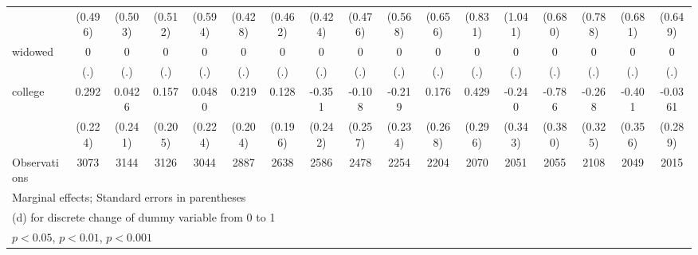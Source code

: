{\begin{tabular}{l*{16}{c}}
                    &     (0.496)         &     (0.503)         &     (0.512)         &     (0.594)         &     (0.428)         &     (0.462)         &     (0.424)         &     (0.476)         &     (0.568)         &     (0.656)         &     (0.831)         &     (1.041)         &     (0.680)         &     (0.788)         &     (0.681)         &     (0.649)         \\
[1em]
widowed             &           0         &           0         &           0         &           0         &           0         &           0         &           0         &           0         &           0         &           0         &           0         &           0         &           0         &           0         &           0         &           0         \\
                    &         (.)         &         (.)         &         (.)         &         (.)         &         (.)         &         (.)         &         (.)         &         (.)         &         (.)         &         (.)         &         (.)         &         (.)         &         (.)         &         (.)         &         (.)         &         (.)         \\
[1em]
college             &       0.292         &      0.0426         &       0.157         &      0.0480         &       0.219         &       0.128         &      -0.351         &      -0.108         &      -0.219         &       0.176         &       0.429         &      -0.240         &      -0.786\sym{*}  &      -0.268         &      -0.401         &     -0.0361         \\
                    &     (0.224)         &     (0.241)         &     (0.205)         &     (0.224)         &     (0.204)         &     (0.196)         &     (0.242)         &     (0.257)         &     (0.234)         &     (0.268)         &     (0.296)         &     (0.343)         &     (0.380)         &     (0.325)         &     (0.356)         &     (0.289)         \\
\hline
Observations        &        3073         &        3144         &        3126         &        3044         &        2887         &        2638         &        2586         &        2478         &        2254         &        2204         &        2070         &        2051         &        2055         &        2108         &        2049         &        2015         \\
\hline\hline
\multicolumn{17}{l}{\footnotesize Marginal effects; Standard errors in parentheses}\\
\multicolumn{17}{l}{\footnotesize  (d) for discrete change of dummy variable from 0 to 1}\\
\multicolumn{17}{l}{\footnotesize \sym{*} \(p<0.05\), \sym{**} \(p<0.01\), \sym{***} \(p<0.001\)}\\
\end{tabular}
}
